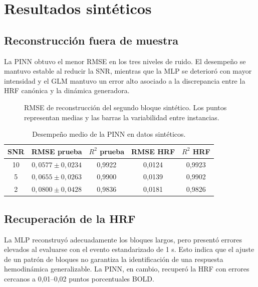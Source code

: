 \section{Resultados sintéticos}

\subsection{Reconstrucción fuera de muestra}

La PINN obtuvo el menor RMSE en los tres niveles de ruido. El desempeño se mantuvo estable al reducir la SNR, mientras que la MLP se deterioró con mayor intensidad y el GLM mantuvo un error alto asociado a la discrepancia entre la HRF canónica y la dinámica generadora.

\begin{figure}[H]
\centering
{}
\caption{RMSE de reconstrucción del segundo bloque sintético. Los puntos representan medias y las barras la variabilidad entre instancias.}
\label{fig:synthetic_signal_rmse}
\end{figure}

\begin{table}[H]
\centering
\caption{Desempeño medio de la PINN en datos sintéticos.}
\label{tab:synthetic_pinn_summary}
\begin{tabular}{ccccc}
\toprule
SNR & RMSE prueba & $R^2$ prueba & RMSE HRF & $R^2$ HRF \\
\midrule
10 & $0,0577\pm0,0234$ & 0,9922 & 0,0124 & 0,9923 \\
5  & $0,0655\pm0,0263$ & 0,9900 & 0,0139 & 0,9902 \\
2  & $0,0800\pm0,0428$ & 0,9836 & 0,0181 & 0,9826 \\
\bottomrule
\end{tabular}
\end{table}

\subsection{Recuperación de la HRF}

La MLP reconstruyó adecuadamente los bloques largos, pero presentó errores elevados al evaluarse con el evento estandarizado de 1 s. Esto indica que el ajuste de un patrón de bloques no garantiza la identificación de una respuesta hemodinámica generalizable. La PINN, en cambio, recuperó la HRF con errores cercanos a 0,01--0,02 puntos porcentuales BOLD.

